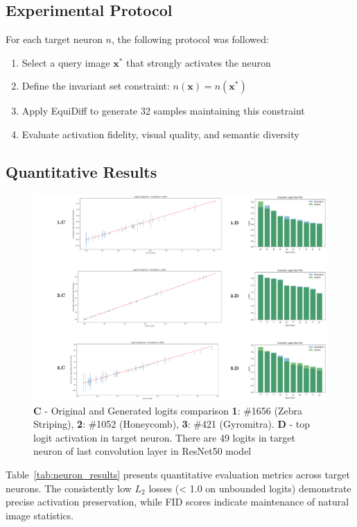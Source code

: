 \documentclass[licencjacka,en]{pracamgr}
\newcommand{\method}[1]{EquiDiff}  %
\begin{document}
\subsection{Experimental Protocol}

For each target neuron $n$, the following protocol was followed:
\begin{enumerate}
\item Select a query image $\mathbf{x^*}$ that strongly activates the neuron
\item Define the invariant set constraint: $n(\mathbf{x}) = n(\mathbf{x^*})$
\item Apply \method{} to generate 32 samples maintaining this constraint
\item Evaluate activation fidelity, visual quality, and semantic diversity
\end{enumerate}

\subsection{Quantitative Results}

\begin{figure}[h]
\centering
\includegraphics[width=\linewidth]{figures/main/sae_results_2.png}
\caption{ \textbf{C} - Original and Generated logits comparison  \textbf{1}: \#1656 (Zebra Striping), \textbf{2}: \#1052 (Honeycomb), \textbf{3}: \#421 (Gyromitra). \textbf{D} - top logit activation in target neuron. There are 49 logits in target neuron of last convolution layer in ResNet50 model}
\label{fig:experiment_1_1}
\end{figure}

Table~\ref{tab:neuron_results} presents quantitative evaluation metrics across target neurons. The consistently low $L_2$ losses (< 1.0 on unbounded logits) demonstrate precise activation preservation, while FID scores indicate maintenance of natural image statistics.
\end{document}

